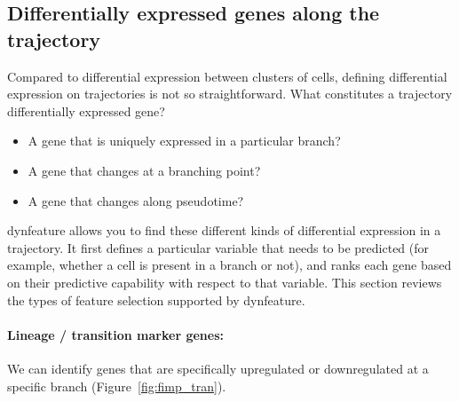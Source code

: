 \subsection{Differentially expressed genes along the trajectory}

Compared to differential expression between clusters of cells, defining
differential expression on trajectories is not so straightforward. What
constitutes a trajectory differentially expressed gene?

\begin{itemize}
\tightlist
\item A gene that is uniquely expressed in a particular branch?
\item A gene that changes at a branching point?
\item A gene that changes along pseudotime?
\end{itemize}

{dynfeature} allows you to find these different kinds of
differential expression in a trajectory. It first defines a particular
variable that needs to be predicted (for example, whether a cell is
present in a branch or not), and ranks each gene based on their
predictive capability with respect to that variable. This section
reviews the types of feature selection supported by {dynfeature}.


\paragraph{Lineage / transition marker genes:}
We can identify genes that are specifically upregulated or downregulated
at a specific branch (Figure~\ref{fig:fimp_tran}).

